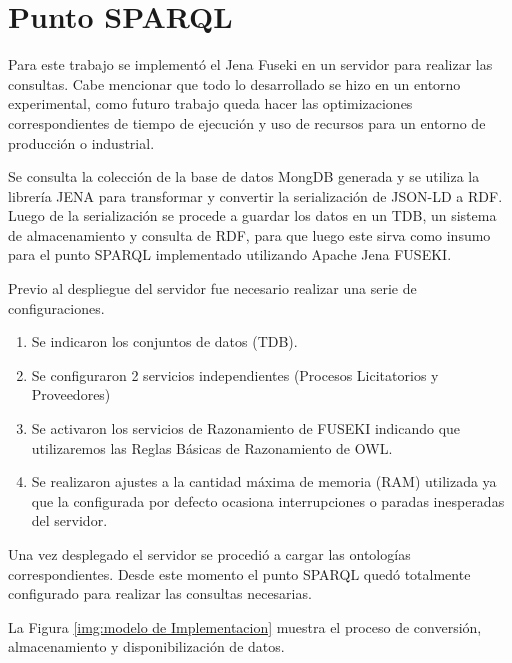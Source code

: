 \section{Punto SPARQL}

Para este trabajo se implementó el Jena Fuseki\cite{ApacheJe97:online} en un servidor para realizar las consultas. Cabe mencionar que todo lo desarrollado se hizo en un entorno experimental, como futuro trabajo queda hacer las optimizaciones correspondientes de tiempo de ejecución y uso de recursos para un entorno de producción o industrial.

Se consulta la colección de la base de datos MongDB generada y se utiliza la librería JENA para transformar y convertir la serialización de JSON-LD a RDF. Luego de la serialización se procede a guardar los datos en un TDB, un sistema de almacenamiento y consulta de RDF, para que luego este sirva como insumo para el punto SPARQL implementado utilizando Apache Jena FUSEKI.

Previo al despliegue del servidor fue necesario realizar una serie de configuraciones.

\begin{enumerate}
    \item Se indicaron los conjuntos de datos (TDB).
    \item Se configuraron 2 servicios independientes (Procesos Licitatorios y Proveedores)
    \item Se activaron los servicios de Razonamiento de FUSEKI indicando que utilizaremos las Reglas Básicas de Razonamiento de OWL. 
    \item Se realizaron ajustes a la cantidad máxima de memoria (RAM) utilizada ya que la configurada por defecto ocasiona interrupciones o paradas inesperadas del servidor. 

\end{enumerate}

Una vez desplegado el servidor se procedió a cargar las ontologías correspondientes. Desde este momento el punto SPARQL quedó totalmente configurado para realizar las consultas necesarias.

La Figura \ref{img:modelo de Implementacion} muestra el proceso de conversión, almacenamiento y disponibilización de datos.
